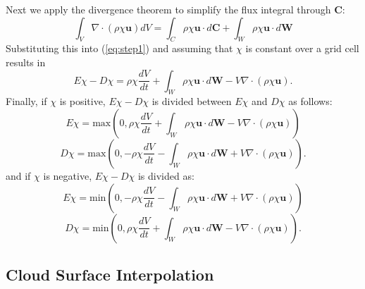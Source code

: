 \documentclass[12pt]{article}
\begin{document}
Next we apply the divergence theorem to simplify the flux integral through 
$\mathbf{C}$:
\begin{equation}
\label{eq:divergence} 
\int_{V} \nabla \cdot (\rho \chi \mathbf{u}) dV = 
  \int_{C} \rho \chi \mathbf{u}\cdot d\mathbf{C}
+ \int_{W} \rho \chi \mathbf{u}\cdot d\mathbf{W}
\end{equation}
Substituting this into (\ref{eq:step1}) and assuming that $\chi$ is constant 
over a grid cell results in
\begin{equation}
\label{eq:entrainment_detrainment} 
E\chi - D\chi = \rho \chi \frac{dV}{dt} 
              + \int_W \rho \chi \mathbf{u} \cdot d\mathbf{W} 
              - V \nabla \cdot (\rho \chi \mathbf{u}).
\end{equation}
Finally, if $\chi$ is positive, $E\chi - D\chi$ is divided between $E\chi$ and 
$D\chi$ as follows:  
\begin{equation}
\label{eq:max_ent} 
E\chi = \mathrm{max}\left(0, \rho \chi \frac{dV}{dt} 
                           + \int_W \rho \chi \mathbf{u} \cdot d\mathbf{W} 
                           - V \nabla \cdot (\rho \chi \mathbf{u})\right)
\end{equation}
\begin{equation}
\label{eq:max_det} 
D\chi = \mathrm{max}\left(0, - \rho \chi \frac{dV}{dt} 
                             - \int_W \rho \chi \mathbf{u} \cdot d\mathbf{W}
                             + V \nabla \cdot (\rho \chi \mathbf{u})\right).
\end{equation}
and if $\chi$ is negative, $E\chi - D\chi$ is divided as:
\begin{equation}
\label{eq:max_ent} 
E\chi = \mathrm{min}\left(0, - \rho \chi \frac{dV}{dt} 
                             - \int_W \rho \chi \mathbf{u} \cdot d\mathbf{W} 
                             + V \nabla \cdot (\rho \chi \mathbf{u})\right)
\end{equation}
\begin{equation}
\label{eq:max_det} 
D\chi = \mathrm{min}\left(0, \rho \chi \frac{dV}{dt} 
                           + \int_W \rho \chi \mathbf{u} \cdot d\mathbf{W}
                           - V \nabla \cdot (\rho \chi \mathbf{u})\right).
\end{equation}



\subsection{Cloud Surface Interpolation}
\end{document}
